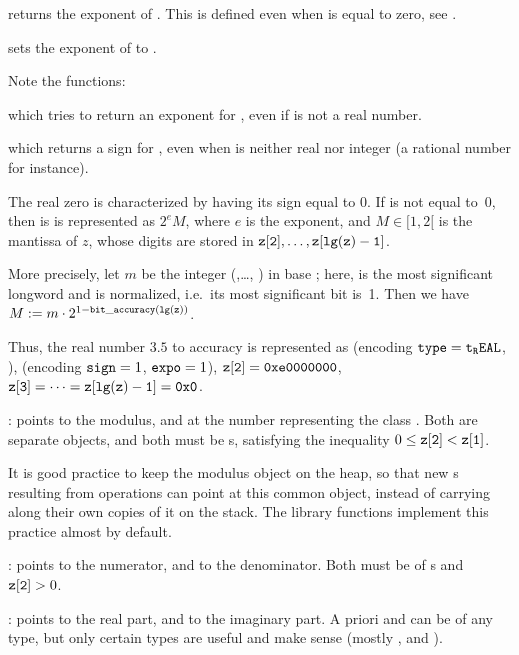  returns the exponent of .
This is defined even when  is equal to zero, see
.

 sets the exponent of  to .

\noindent Note the functions:

 which tries to return an exponent for ,
even if  is not a real number.

 which returns a sign for , even when
 is neither real nor integer (a rational number for instance).

The real zero is characterized by having its sign equal to 0. If  is
not equal to~0, then is is represented as $2^e M$, where $e$ is the exponent,
and $M\in [1, 2[$ is the mantissa of $z$, whose digits are stored in
${\tt z[2]},\dots, {\tt z[lg(z)-1]}$.

More precisely, let $m$ be the integer (,\dots, )
in base ; here,  is the most significant
longword and is normalized, i.e.~its most significant bit is~1. Then we have
$M := m \cdot 2^{1 - {\tt bit\_accuracy(lg(z))}}$.

Thus, the real number $3.5$ to accuracy  is
represented as  (encoding ${\tt type} = {\tt t_REAL}$, ),
 (encoding ${\tt sign} = 1$, ${\tt expo} = 1$), ${\tt z[2]} =
{\tt 0xe0000000}$, ${\tt z[3]} =\dots = {\tt z[lg(z)-1]} = {\tt 0x0}$.

:
 points to the modulus, and  at the number representing
the class . Both are separate  objects, and both must be
s, satisfying the inequality $0 \le {\tt z[2]} < {\tt z[1]}$.

It is good practice to keep the modulus object on the heap, so that new
s resulting from operations can point at this common object,
instead of carrying along their own copies of it on the stack. The library
functions implement this practice almost by default.

:%
 points to the numerator, and  to the denominator. Both
must be of s and ${\tt z[2]} > 0$.

:%
 points to the real part, and  to the imaginary part. A
priori  and  can be of any type, but only certain types
are useful and make sense (mostly ,  and ).

